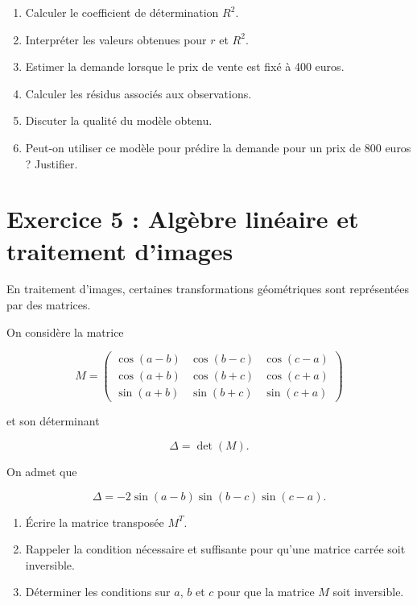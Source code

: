\documentclass[12pt,a4paper]{article}
\begin{document}
\begin{enumerate}
\begin{enumerate}
\item Calculer le coefficient de détermination $R^2$.

\item Interpréter les valeurs obtenues pour $r$ et $R^2$.

\item Estimer la demande lorsque le prix de vente est fixé à 400 euros.

\item Calculer les résidus associés aux observations.

\item Discuter la qualité du modèle obtenu.

\item Peut-on utiliser ce modèle pour prédire la demande pour un prix de 800 euros ? Justifier.

\end{enumerate}

\section*{Exercice 5 : Algèbre linéaire et traitement d'images}

En traitement d'images, certaines transformations géométriques sont représentées par des matrices.

On considère la matrice

\[
M=
\begin{pmatrix}
\cos(a-b) & \cos(b-c) & \cos(c-a)\\
\cos(a+b) & \cos(b+c) & \cos(c+a)\\
\sin(a+b) & \sin(b+c) & \sin(c+a)
\end{pmatrix}
\]

et son déterminant

\[
\Delta = \det(M).
\]

On admet que

\[
\Delta =
-2\sin(a-b)\sin(b-c)\sin(c-a).
\]

\begin{enumerate}

\item Écrire la matrice transposée $M^T$.

\item Rappeler la condition nécessaire et suffisante pour qu'une matrice carrée soit inversible.

\item Déterminer les conditions sur $a$, $b$ et $c$ pour que la matrice $M$ soit inversible.


\end{enumerate}
\end{enumerate}
\end{document}
